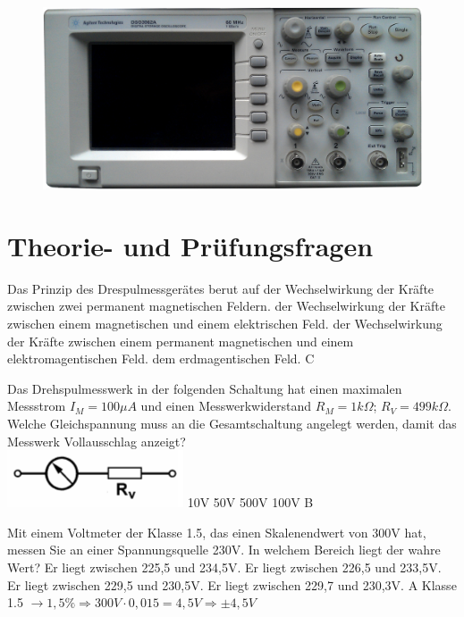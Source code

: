 \begin{figure}
 \vspace{-6cm}
 \includegraphics[scale=0.08]{Messtechnik/Bilder/oszi_foto.png}
 \vspace{-6cm}
\end{figure}

\section*{Theorie- und Prüfungsfragen} 

{Das Prinzip des Drespulmessgerätes berut auf}%
{der Wechselwirkung der Kräfte zwischen zwei permanent magnetischen Feldern.}%
{der Wechselwirkung der Kräfte zwischen einem magnetischen und einem elektrischen Feld.}%
{der Wechselwirkung der Kräfte zwischen einem permanent magnetischen und einem elektromagentischen Feld.}%
{dem erdmagentischen Feld.}%
{C}%

{Das Drehspulmesswerk in der folgenden Schaltung hat einen maximalen Messstrom $I_M = 100\mu A$ und einen Messwerkwiderstand $R_M = 1 k\Omega$; $R_V = 499 k\Omega$. Welche Gleichspannung muss an die Gesamtschaltung angelegt werden, damit das Messwerk Vollausschlag anzeigt?\\
\includegraphics[scale=0.5]{Messtechnik/Bilder/TJ102.png}}%
{10V}%
{50V}%
{500V}%
{100V}%
{B}%


{Mit einem Voltmeter der Klasse 1.5, das einen Skalenendwert von 300V hat, messen Sie an einer Spannungsquelle 230V. In welchem Bereich liegt der wahre Wert?}%
{Er liegt zwischen 225,5 und 234,5V.}%
{Er liegt zwischen 226,5 und 233,5V.}%
{Er liegt zwischen 229,5 und 230,5V.}%
{Er liegt zwischen 229,7 und 230,3V.}%
{A \hspace{3em} Klasse 1.5 $\rightarrow 1,5\% \Rightarrow
                            300V \cdot 0,015 = 4,5V \Rightarrow \pm 4,5V$ }%


